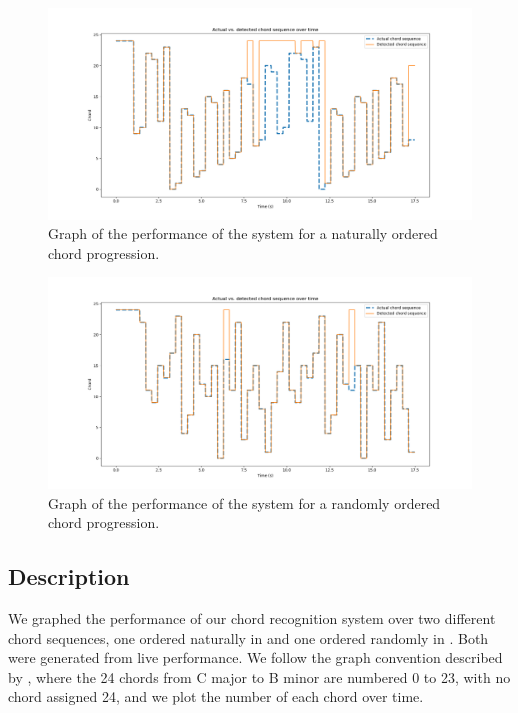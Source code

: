 \documentclass[journal]{IEEEtran}
\begin{document}
\begin{figure}[!t]
    \centering
    \includegraphics[width = \linewidth]{../Figures/chord_sequence_in_order}
    \caption{Graph of the performance of the system for a naturally ordered chord progression.}
    \label{fig:in_order}
\end{figure}
\begin{figure}[!t]
    \centering
    \includegraphics[width = \linewidth]{../Figures/chord_sequence_random}
    \caption{Graph of the performance of the system for a randomly ordered chord progression.}
    \label{fig:random}
\end{figure}


\subsection{Description}
We graphed the performance of our chord recognition system over two different chord sequences, one ordered naturally in  and one ordered randomly in .
Both were generated from live performance.
We follow the graph convention described by \cite{harte}, where the 24 chords from C major to B minor are numbered 0 to 23, with no chord assigned 24, and we plot the number of each chord over time.
\end{document}
